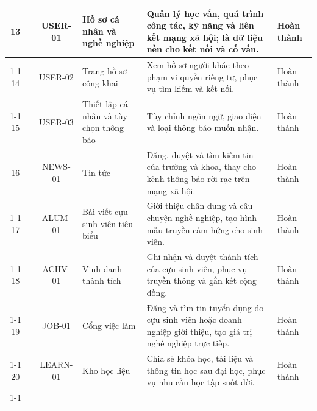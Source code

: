 \documentclass[12pt,a4paper,oneside]{report}
\begin{document}
\begin{longtable}{|c|>{\raggedright\arraybackslash}p{2.5cm}|c|>{\raggedright\arraybackslash}p{3.1cm}|>{\raggedright\arraybackslash}p{5.0cm}|>{\raggedright\arraybackslash}p{1.9cm}|}
\hline
\cellcolor{oldrow}13 & \cellcolor{oldrow} & \cellcolor{oldrow}USER-01 & \cellcolor{oldrow}Hồ sơ cá nhân và nghề nghiệp & \cellcolor{oldrow}Quản lý học vấn, quá trình công tác, kỹ năng và liên kết mạng xã hội; là dữ liệu nền cho kết nối và cố vấn. & \cellcolor{oldrow}Hoàn thành \\
\cline{1-1}\cline{3-6}
\cellcolor{oldrow}14 & \cellcolor{oldrow} & \cellcolor{oldrow}USER-02 & \cellcolor{oldrow}Trang hồ sơ công khai & \cellcolor{oldrow}Xem hồ sơ người khác theo phạm vi quyền riêng tư, phục vụ tìm kiếm và kết nối. & \cellcolor{oldrow}Hoàn thành \\
\cline{1-1}\cline{3-6}
\cellcolor{oldrow}15 & \multirow{-3}{2.4cm}{\cellcolor{oldrow}\textbf{Hồ sơ người dùng}} & \cellcolor{oldrow}USER-03 & \cellcolor{oldrow}Thiết lập cá nhân và tùy chọn thông báo & \cellcolor{oldrow}Tùy chỉnh ngôn ngữ, giao diện và loại thông báo muốn nhận. & \cellcolor{oldrow}Hoàn thành \\
\hline
\cellcolor{oldrow}16 & \cellcolor{oldrow} & \cellcolor{oldrow}NEWS-01 & \cellcolor{oldrow}Tin tức & \cellcolor{oldrow}Đăng, duyệt và tìm kiếm tin của trường và khoa, thay cho kênh thông báo rời rạc trên mạng xã hội. & \cellcolor{oldrow}Hoàn thành \\
\cline{1-1}\cline{3-6}
\cellcolor{oldrow}17 & \cellcolor{oldrow} & \cellcolor{oldrow}ALUM-01 & \cellcolor{oldrow}Bài viết cựu sinh viên tiêu biểu & \cellcolor{oldrow}Giới thiệu chân dung và câu chuyện nghề nghiệp, tạo hình mẫu truyền cảm hứng cho sinh viên. & \cellcolor{oldrow}Hoàn thành \\
\cline{1-1}\cline{3-6}
\cellcolor{oldrow}18 & \cellcolor{oldrow} & \cellcolor{oldrow}ACHV-01 & \cellcolor{oldrow}Vinh danh thành tích & \cellcolor{oldrow}Ghi nhận và duyệt thành tích của cựu sinh viên, phục vụ truyền thông và gắn kết cộng đồng. & \cellcolor{oldrow}Hoàn thành \\
\cline{1-1}\cline{3-6}
\cellcolor{oldrow}19 & \cellcolor{oldrow} & \cellcolor{oldrow}JOB-01 & \cellcolor{oldrow}Cổng việc làm & \cellcolor{oldrow}Đăng và tìm tin tuyển dụng do cựu sinh viên hoặc doanh nghiệp giới thiệu, tạo giá trị nghề nghiệp trực tiếp. & \cellcolor{oldrow}Hoàn thành \\
\cline{1-1}\cline{3-6}
\cellcolor{oldrow}20 & \cellcolor{oldrow} & \cellcolor{oldrow}LEARN-01 & \cellcolor{oldrow}Kho học liệu & \cellcolor{oldrow}Chia sẻ khóa học, tài liệu và thông tin học sau đại học, phục vụ nhu cầu học tập suốt đời. & \cellcolor{oldrow}Hoàn thành \\
\cline{1-1}\cline{3-6}

\end{longtable}
\end{document}

